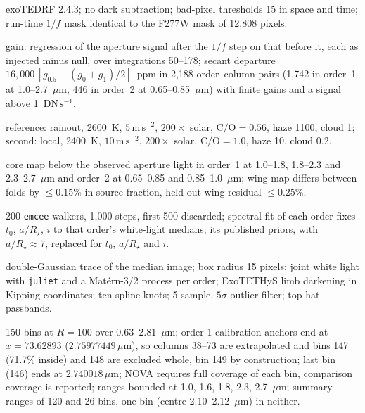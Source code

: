 {\begin{description}[font=\normalfont\itshape,leftmargin=0pt,itemsep=0pt,topsep=2pt]
  \item[NOVA's processing.] exoTEDRF 2.4.3; no dark subtraction; bad-pixel thresholds 15 in space and time; run-time $1/f$ mask identical to the F277W mask of 12{,}808 pixels.
  \item[Grey test.] gain: regression of the aperture signal after the $1/f$ step on that before it, each as injected minus null, over integrations 50--178; secant departure $16{,}000\,[g_{0.5}-(g_0+g_1)/2]$~ppm in 2{,}188 order--column pairs (1{,}742 in order~1 at 1.0--2.7~$\mu\mathrm{m}$, 446 in order~2 at 0.65--0.85~$\mu\mathrm{m}$) with finite gains and a signal above 1~$\mathrm{DN\,s^{-1}}$.
  \item[Pilot atmospheres.] reference: rainout, 2600~K, $5\,\mathrm{m\,s^{-2}}$, $200\times$ solar, $\mathrm{C/O}=0.56$, haze 1100, cloud 1; second: local, 2400~K, $10\,\mathrm{m\,s^{-2}}$, $200\times$ solar, $\mathrm{C/O}=1.0$, haze 10, cloud 0.2.
  \item[Per-visit checks.] core map below the observed aperture light in order~1 at 1.0--1.8, 1.8--2.3 and 2.3--2.7~$\mu\mathrm{m}$ and order~2 at 0.65--0.85 and 0.85--1.0~$\mu\mathrm{m}$; wing map differs between folds by $\leq0.15\%$ in source fraction, held-out wing residual $\leq0.25\%$.
  \item[Ahsoka.] 200 \texttt{emcee} walkers, 1{,}000 steps, first 500 discarded; spectral fit of each order fixes $t_0$, $a/R_\star$, $i$ to that order's white-light medians; its published priors, with $a/R_\star\approx7$, replaced for $t_0$, $a/R_\star$ and $i$.
  \item[\texttt{transitspectroscopy}.] double-Gaussian trace of the median image; box radius 15 pixels; joint white light with \texttt{juliet} and a Mat\'ern-3/2 process per order; ExoTETHyS limb darkening in Kipping coordinates; ten spline knots; 5-sample, $5\sigma$ outlier filter; top-hat passbands.
  \item[Reporting.] 150 bins at $R=100$ over 0.63--2.81~$\mu\mathrm{m}$; order-1 calibration anchors end at $x=73.62893$ ($2.75977449\,\mu\mathrm{m}$), so columns 38--73 are extrapolated and bins 147 (71.7\% inside) and 148 are excluded whole, bin 149 by construction; last bin (146) ends at $2.740018\,\mu\mathrm{m}$; NOVA requires full coverage of each bin, comparison coverage is reported; ranges bounded at 1.0, 1.6, 1.8, 2.3, 2.7~$\mu\mathrm{m}$; summary ranges of 120 and 26 bins, one bin (centre 2.10--2.12~$\mu\mathrm{m}$) in neither.
\end{description}
}
